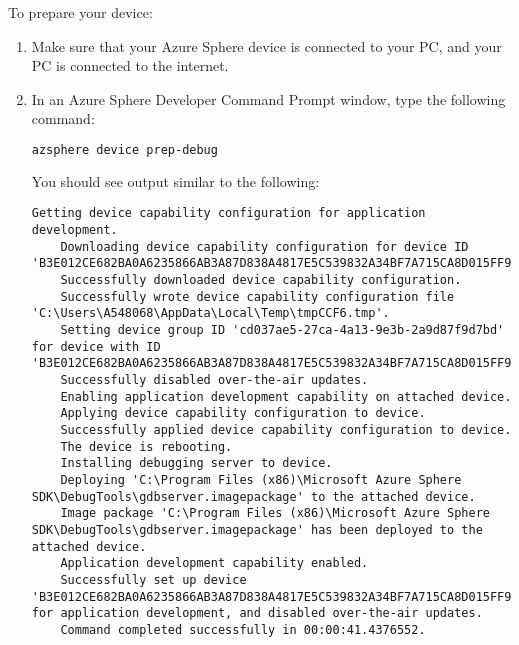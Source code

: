 To prepare your device:
\begin{enumerate}
    \item Make sure that your Azure Sphere device is connected to your PC, and your PC is connected to the internet.
    \item In an Azure Sphere Developer Command Prompt window, type the following command:
    \begin{lstlisting}[language=bash]
    azsphere device prep-debug
    \end{lstlisting}
    
    You should see output similar to the following:
    \begin{lstlisting}[]
    Getting device capability configuration for application development.
    Downloading device capability configuration for device ID 'B3E012CE682BA0A6235866AB3A87D838A4817E5C539832A34BF7A715CA8D015FF99C84B909CB2886916259AD186B212E148FC9C4BF8BB6A275A11A2B9495D578'.
    Successfully downloaded device capability configuration.
    Successfully wrote device capability configuration file 'C:\Users\A548068\AppData\Local\Temp\tmpCCF6.tmp'.
    Setting device group ID 'cd037ae5-27ca-4a13-9e3b-2a9d87f9d7bd' for device with ID 'B3E012CE682BA0A6235866AB3A87D838A4817E5C539832A34BF7A715CA8D015FF99C84B909CB2886916259AD186B212E148FC9C4BF8BB6A275A11A2B9495D578'.
    Successfully disabled over-the-air updates.
    Enabling application development capability on attached device.
    Applying device capability configuration to device.
    Successfully applied device capability configuration to device.
    The device is rebooting.
    Installing debugging server to device.
    Deploying 'C:\Program Files (x86)\Microsoft Azure Sphere SDK\DebugTools\gdbserver.imagepackage' to the attached device.
    Image package 'C:\Program Files (x86)\Microsoft Azure Sphere SDK\DebugTools\gdbserver.imagepackage' has been deployed to the attached device.
    Application development capability enabled.
    Successfully set up device 'B3E012CE682BA0A6235866AB3A87D838A4817E5C539832A34BF7A715CA8D015FF99C84B909CB2886916259AD186B212E148FC9C4BF8BB6A275A11A2B9495D578' for application development, and disabled over-the-air updates.
    Command completed successfully in 00:00:41.4376552.
    \end{lstlisting}
\end{enumerate}


